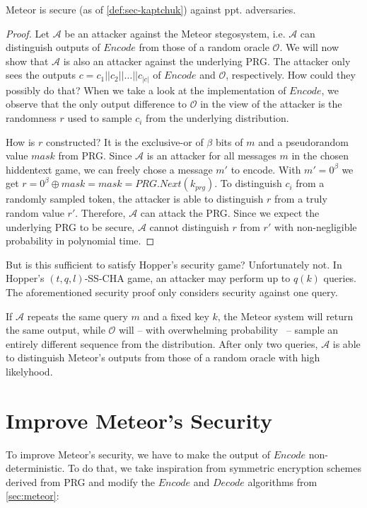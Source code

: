 \begin{theorem}
	Meteor is secure (as of \autoref{def:sec-kaptchuk}) against ppt. adversaries. 
\end{theorem}
\begin{proof}
	Let $\mathcal{A}$ be an attacker against the Meteor stegosystem, i.e. $\mathcal{A}$ can distinguish outputs of $Encode$ from those of a random oracle $\mathcal{O}$. We will now show that $\mathcal{A}$ is also an attacker against the underlying PRG.
	The attacker only sees the outputs $c = c_1 ||c_2 || \dots || c_{|c|}$ of $Encode$ and $\mathcal{O}$, respectively. 
	How could they possibly do that?
	When we take a look at the implementation of $Encode$, we observe that the only output difference to $\mathcal{O}$ in the view of the attacker is the randomness $r$ used to sample $c_i$ from the underlying distribution.
	
	How is $r$ constructed? 
	It is the exclusive-or of $\beta$ bits of $m$ and a pseudorandom value $mask$ from PRG.
	Since $\mathcal{A}$ is an attacker for all messages $m$ in the chosen hiddentext game, we can freely chose a message $m'$ to encode.
	With $m' = 0^\beta$ we get $r = 0^\beta \oplus mask = mask = PRG.Next(k_{prg})$.
	To distinguish $c_i$ from a randomly sampled token, the attacker is able to distinguish $r$ from a truly random value $r'$.
	Therefore, $\mathcal{A}$ can attack the PRG.
	Since we expect the underlying PRG to be secure, $\mathcal{A}$ cannot distinguish $r$ from $r'$ with non-negligible probability in polynomial time.
\end{proof}

But is this sufficient to satisfy Hopper's security game?
Unfortunately not.
In Hopper's $(t,q,l)$-SS-CHA game, an attacker may perform up to $q(k)$ queries.
The aforementioned security proof only considers security against one query.

If $\mathcal{A}$ repeats the same query $m$ and a fixed key $k$, the Meteor system will return the same output, while $\mathcal{O}$ will -- with overwhelming probability~ -- sample an entirely different sequence from the distribution.
After only two queries, $\mathcal{A}$ is able to distinguish Meteor's outputs from those of a random oracle with high likelyhood.

\section{Improve Meteor's Security}

To improve Meteor's security, we have to make the output of $Encode$ non-deterministic. To do that, we take inspiration from symmetric encryption schemes derived from PRG and modify the $Encode$ and $Decode$ algorithms from \autoref{sec:meteor}:

